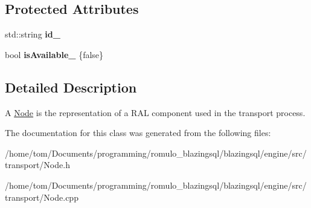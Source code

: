 \subsection*{Protected Attributes}
\begin{DoxyCompactItemize}
\item 
\mbox{\label{classblazingdb_1_1transport_1_1Node_a51b72b84fde931b439be0d8dba42c0be}} 
std\+::string {\bfseries id\+\_\+}
\item 
\mbox{\label{classblazingdb_1_1transport_1_1Node_a7db6157f236fac7b33b46b707ead427a}} 
bool {\bfseries is\+Available\+\_\+} \{false\}
\end{DoxyCompactItemize}


\subsection{Detailed Description}
A \hyperlink{classblazingdb_1_1transport_1_1Node}{Node} is the representation of a R\+AL component used in the transport process. 

The documentation for this class was generated from the following files\+:\begin{DoxyCompactItemize}
\item 
/home/tom/\+Documents/programming/romulo\+\_\+blazingsql/blazingsql/engine/src/transport/Node.\+h\item 
/home/tom/\+Documents/programming/romulo\+\_\+blazingsql/blazingsql/engine/src/transport/Node.\+cpp\end{DoxyCompactItemize}
